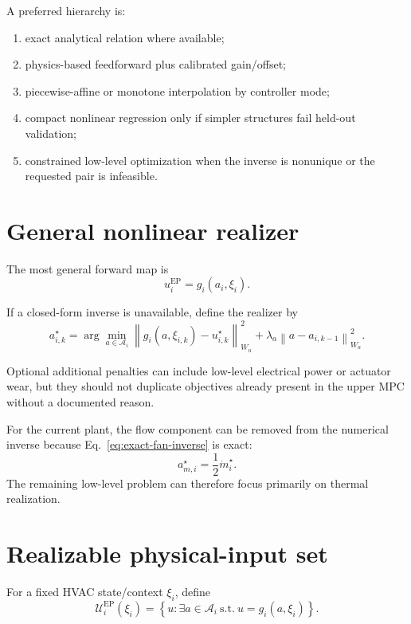 \documentclass[11pt]{article}
\newcommand{\mdot}{\dot m}
\begin{document}
A preferred hierarchy is:
\begin{enumerate}[leftmargin=2em]
\item exact analytical relation where available;
\item physics-based feedforward plus calibrated gain/offset;
\item piecewise-affine or monotone interpolation by controller mode;
\item compact nonlinear regression only if simpler structures fail held-out
validation;
\item constrained low-level optimization when the inverse is nonunique or the
requested pair is infeasible.
\end{enumerate}

\section{General nonlinear realizer}

The most general forward map is
\begin{equation}
u_i^{\mathrm{EP}}
=
g_i(a_i,\xi_i).
\label{eq:general-forward}
\end{equation}

If a closed-form inverse is unavailable, define the realizer by
\begin{equation}
\boxed{
a_{i,k}^{\star}
=
\arg\min_{a\in\mathcal A_i}
\left\|
g_i(a,\xi_{i,k})
-
u_{i,k}^{\star}
\right\|_{W_u}^{2}
+
\lambda_a
\left\|
a-a_{i,k-1}
\right\|_{W_a}^{2}.
}
\label{eq:low-level-realizer-optimization}
\end{equation}

Optional additional penalties can include low-level electrical power or
actuator wear, but they should not duplicate objectives already present in the
upper MPC without a documented reason.

For the current plant, the flow component can be removed from the numerical
inverse because Eq.~\eqref{eq:exact-fan-inverse} is exact:
\begin{equation}
a_{m,i}^{\star}
=
\frac12 \mdot_i^\star.
\end{equation}
The remaining low-level problem can therefore focus primarily on thermal
realization.

\section{Realizable physical-input set}

For a fixed HVAC state/context $\xi_i$, define
\begin{equation}
\mathcal U_i^{\mathrm{EP}}(\xi_i)
=
\left\{
u:
\exists a\in\mathcal A_i
\ \mathrm{s.t.}\
u=g_i(a,\xi_i)
\right\}.
\label{eq:ep-feasible-set}
\end{equation}
\end{document}
